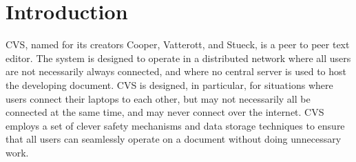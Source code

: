 \section{Introduction}
CVS, named for its creators Cooper, Vatterott, and Stueck, is a peer to peer text editor.  The system is designed to operate in a distributed network where all users are not necessarily always connected, and where no central server is used to host the developing document.  CVS is designed, in particular, for situations where users connect their laptops to each other, but may not necessarily all be connected at the same time, and may never connect over the internet.  CVS employs a set of clever safety mechanisms and data storage techniques to ensure that all users can seamlessly operate on a document without doing unnecessary work.